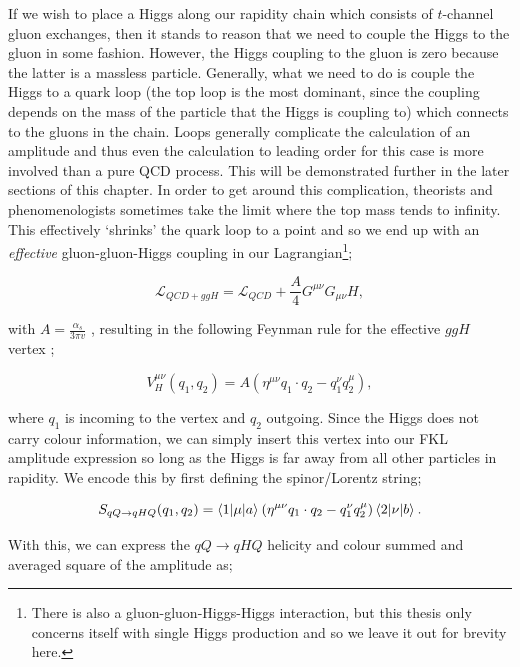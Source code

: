 If we wish to place a Higgs along our rapidity chain which consists of $t$-channel gluon exchanges, then it stands to reason that we need to couple the Higgs to the gluon in some fashion. However, the Higgs coupling to the gluon is zero because the latter is a massless particle. Generally, what we need to do is couple the Higgs to a quark loop (the top loop is the most dominant, since the coupling depends on the mass of the particle that the Higgs is coupling to) which connects to the gluons in the chain. Loops generally complicate the calculation of an amplitude and thus even the calculation to leading order for this case is more involved than a pure QCD process. This will be demonstrated further in the later sections of this chapter. In order to get around this complication, theorists and phenomenologists sometimes take the limit where the top mass tends to infinity. This effectively `shrinks' the quark loop to a point and so we end up with an \emph{effective} gluon-gluon-Higgs coupling in our Lagrangian\footnote{There is also a gluon-gluon-Higgs-Higgs interaction, but this thesis only concerns itself with single Higgs production and so we leave it out for brevity here.};

\begin{equation}
\mathscr{L}_{QCD + ggH} = \mathscr{L}_{QCD} + \frac{A}{4} G^{\mu \nu}G_{\mu \nu}H,
\end{equation}

with $A = \frac{\alpha_s}{3 \pi v}$ \cite{Duca2003}, resulting in the following Feynman rule for the effective $ggH$ vertex \cite{Andersen2009a};

\begin{equation}
V_H^{\mu \nu}(q_1, q_2) = A \left( \eta^{\mu \nu} q_1 \cdot q_2 - q_1^\nu q_2^\mu \right),
\end{equation}

where $q_1$ is incoming to the vertex and $q_2$ outgoing. Since the Higgs does not carry colour information, we can simply insert this vertex into our FKL amplitude expression so long as the Higgs is far away from all other particles in rapidity. We encode this by first defining the spinor/Lorentz string;

\begin{equation}
S_{qQ \to qHQ}(q_1, q_2) = \mathinner{\langle1\vert\mu\vert a\rangle}_{} (\eta^{\mu \nu}q_1 \cdot q_2 - q_1^\nu q_2^\mu)\mathinner{\langle2\vert\nu\vert b\rangle}_{}. 
\end{equation} %

With this, we can express the $qQ \to qHQ$ helicity and colour summed and averaged square of the amplitude as;

